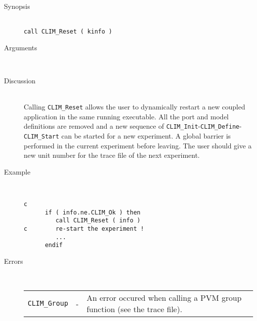 %
%
\begin{description}
  \item[Synopsis]~ \\[10pt]
    {\tt call CLIM\_Reset ( kinfo )}
  \item[Arguments]~
  \item[Discussion]~\\[10pt]
    Calling {\tt CLIM\_Reset} allows the user to dynamically restart
    a new coupled application in the same running executable. 
    All the port and model definitions are
    removed and a new sequence of {\tt CLIM\_Init}-{\tt CLIM\_Define}-
    {\tt CLIM\_Start} can be started for a new experiment. A global
    barrier is performed in the current experiment before leaving.
    The user should give a new unit number for the trace file of the
    next experiment.
  \item[Example]~
    \begin{verbatim}
c
      if ( info.ne.CLIM_Ok ) then
         call CLIM_Reset ( info )
c        re-start the experiment !
         ...
      endif
    \end{verbatim}
  \item[Errors]~\\[10pt]
    \begin{tabular}{l l p{10cm} }
      {\tt CLIM\_Group} & - & An error occured when calling a PVM group
function (see the trace file). \\
    \end{tabular}
\end{description}

